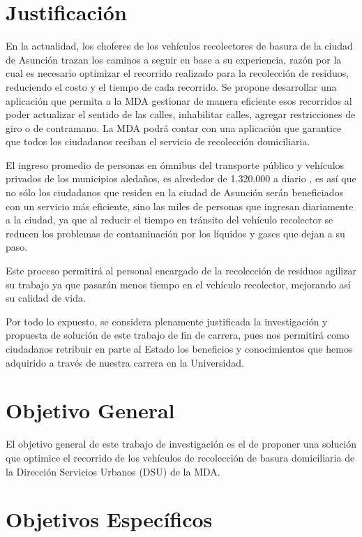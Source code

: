 \section{Justificación}
 En la actualidad, los choferes de los vehículos recolectores de basura de la ciudad de Asunción trazan los caminos a seguir en base a su experiencia, razón por la cual es necesario optimizar el recorrido realizado para la recolección de residuos, reduciendo el costo y el tiempo de cada recorrido. Se propone desarrollar una aplicación que permita a la MDA gestionar de manera eficiente esos recorridos al poder actualizar el sentido de las calles, inhabilitar calles, agregar restricciones de giro o de contramano. La MDA podrá contar con una aplicación que garantice que todos los ciudadanos reciban el servicio de recolección domiciliaria.

El ingreso promedio de personas en ómnibus del transporte público y vehículos privados de los municipios aledaños, es alrededor de 1.320.000 a diario \citep{DiarioABCColor2016PorColor}, es así que no sólo los ciudadanos que residen en la ciudad de Asunción serán beneficiados con un servicio más eficiente, sino las miles de personas que ingresan diariamente a la ciudad, ya que al reducir el tiempo en tránsito del vehículo recolector se reducen los problemas de contaminación por los líquidos y gases que dejan a su paso.

Este proceso permitirá al personal encargado de la recolección de residuos agilizar su trabajo ya que pasarán menos tiempo en el vehículo recolector, mejorando así su calidad de vida.
 
Por todo lo expuesto, se considera plenamente justificada la investigación y propuesta de solución de este trabajo de fin de carrera, pues nos permitirá como ciudadanos retribuir en parte al Estado los beneficios y conocimientos que hemos adquirido a través de nuestra carrera en la Universidad.

\section{Objetivo General}
El objetivo general de este trabajo de investigación es el de proponer una solución que optimice el recorrido de los vehículos de recolección de basura domiciliaria de la Dirección Servicios Urbanos (DSU) de la MDA.

\section{Objetivos Específicos}


